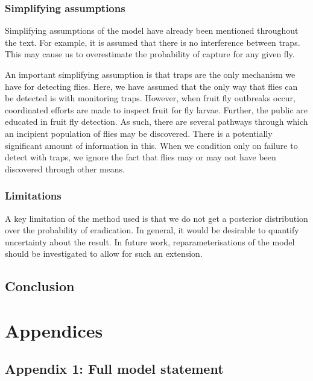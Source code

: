 \documentclass[
  oneside]{book}
\begin{document}
\hypertarget{simplifying-assumptions}{%
\subsection{Simplifying assumptions}\label{simplifying-assumptions}}

Simplifying assumptions of the model have already been mentioned throughout the text. For example, it is assumed that there is no interference between traps. This may cause us to overestimate the probability of capture for any given fly.

An important simplifying assumption is that traps are the only mechanism we have for detecting flies. Here, we have assumed that the only way that flies can be detected is with monitoring traps. However, when fruit fly outbreaks occur, coordinated efforts are made to inspect fruit for fly larvae. Further, the public are educated in fruit fly detection. As such, there are several pathways through which an incipient population of flies may be discovered. There is a potentially significant amount of information in this. When we condition only on failure to detect with traps, we ignore the fact that flies may or may not have been discovered through other means.

\hypertarget{limitations}{%
\subsection{Limitations}\label{limitations}}

A key limitation of the method used is that we do not get a posterior distribution over the probability of eradication. In general, it would be desirable to quantify uncertainty about the result. In future work, reparameterisations of the model should be investigated to allow for such an extension.

\hypertarget{conclusion-2}{%
\section{Conclusion}\label{conclusion-2}}

\renewcommand{\baselinestretch}{1}\normalsize

\hypertarget{appendices}{%
\chapter{Appendices}\label{appendices}}

\hypertarget{appendix-1-full-model-statement}{%
\section{Appendix 1: Full model statement}\label{appendix-1-full-model-statement}}
\end{document}
